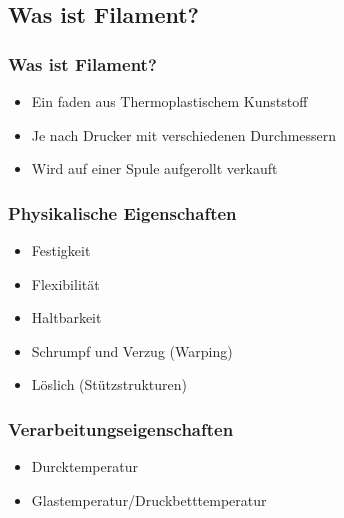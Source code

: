 \subsection{Was ist Filament?}
{
\begin{frame}
  \frametitle{Was ist Filament?} \pause
  \begin{itemize}
    \item Ein faden aus Thermoplastischem Kunststoff \pause
    \item Je nach Drucker mit verschiedenen Durchmessern \pause
    \item Wird auf einer Spule aufgerollt verkauft
  \end{itemize}
\end{frame}
\begin{frame}
  \frametitle{Physikalische Eigenschaften}
  \pause
  \begin{itemize}
    \item Festigkeit \pause
    \item Flexibilität \pause
    \item Haltbarkeit \pause
    \item Schrumpf und Verzug (Warping) \pause
    \item Löslich (Stützstrukturen)
  \end{itemize}
\end{frame}

\begin{frame}
  \frametitle{Verarbeitungseigenschaften}
  \pause
  \begin{itemize}
    \item Durcktemperatur \pause
    \item Glastemperatur/Druckbetttemperatur
  \end{itemize}
\end{frame}
}
